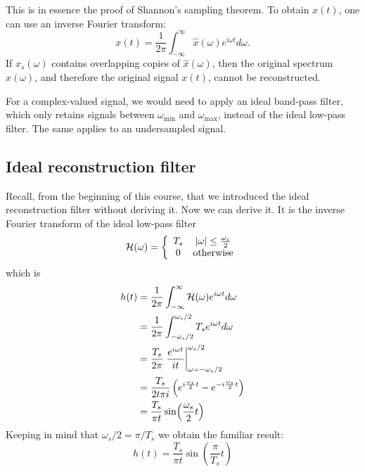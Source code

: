 This is in essence the proof of Shannon's sampling theorem. To obtain $x(t)$, 
one can use an inverse Fourier transform:
\begin{equation}
  x(t) = \frac{1}{2\pi}\int_{-\infty}^{\infty} \hat{x}(\omega) e^{i\omega t}d\omega.
\end{equation}
If $\hat{x}_s(\omega)$ contains overlapping copies of $\hat{x}(\omega)$, then the original 
spectrum $\hat{x}(\omega)$, and therefore the original signal $x(t)$, cannot be reconstructed.

For a complex-valued signal, we would need to apply an ideal band-pass filter, which only 
retains signals between $\omega_{\mathrm{min}}$ and
$\omega_{\mathrm{max}}$, instead of the ideal low-pass filter. The same applies to an undersampled signal.

\subsection{Ideal reconstruction filter}
Recall, from the beginning of this course, that we introduced the ideal reconstruction filter without deriving it. 
Now we can derive it. It is the inverse Fourier transform of the ideal low-pass filter
\begin{equation}
  \mathcal{H}(\omega) = \left\{ \begin{array}{cc}
    T_s & |\omega| \le \frac{\omega_s}{2} \\
    0   & \mathrm{otherwise}
  \end{array}
  \right.
\end{equation}
which is
\begin{align}
  h(t) & = \frac{1}{2\pi}\int_{-\infty}^{\infty} \mathcal{H}(\omega) e^{i\omega t}d\omega                             \\
       & = \frac{1}{2\pi} \int_{-\omega_s/2}^{\omega_s/2} T_s e^{i\omega t}d\omega                     \\
       & = \frac{T_s}{2 \pi}\left. \frac{e^{i\omega t}}{it} \right|_{\omega=-\omega_s/2}^{\omega_s/2}  \\
       & = \frac{T_s}{2 t \pi i}\left( e^{i\frac{\omega_s}{2} t}  - e^{-i\frac{\omega_s}{2} t} \right) \\
       & = \frac{T_s}{\pi t} \sin(\frac{\omega_s}{2}t)                                                 
\end{align}
Keeping in mind that $\omega_s/2 = \pi/T_s$ we obtain the familiar result:
\begin{equation}
  \boxed{
    h(t) = \frac{T_s}{\pi t}\sin(\frac{\pi}{T_s}t)
  }
\end{equation}
